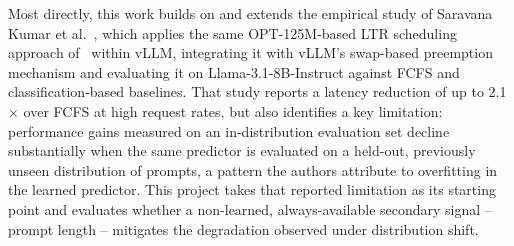 Most directly, this work builds on and extends the empirical study of
Saravana Kumar et al.~\cite{saravanakumar2025empirical}, which applies the
same OPT-125M-based LTR scheduling approach of~\cite{fu2024efficient} within
vLLM, integrating it with vLLM's swap-based preemption mechanism and
evaluating it on Llama-3.1-8B-Instruct against FCFS and classification-based
baselines. That study reports a latency reduction of up to 2.1$\times$ over
FCFS at high request rates, but also identifies a key limitation: performance
gains measured on an in-distribution evaluation set decline substantially
when the same predictor is evaluated on a held-out, previously unseen
distribution of prompts, a pattern the authors attribute to overfitting in
the learned predictor. This project takes that reported limitation as its
starting point and evaluates whether a non-learned, always-available
secondary signal -- prompt length -- mitigates the degradation observed
under distribution shift.
